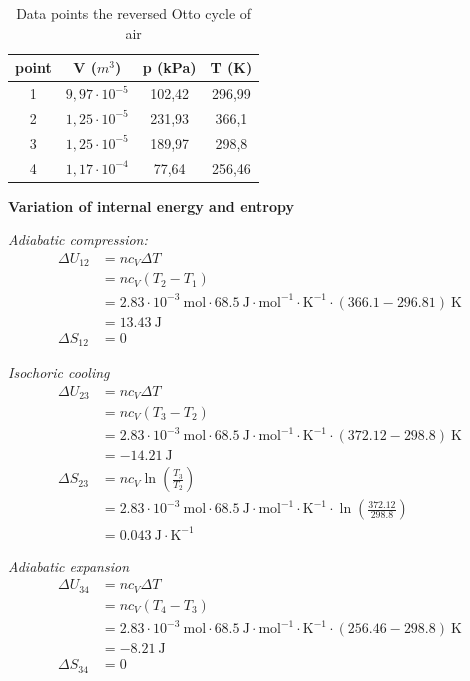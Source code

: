 \documentclass{scrartcl}
\begin{document}
\begin{table}[!ht]
    \centering
    \begin{tabular}{c|c|c|c}
        point & V ($m^3$) & p (kPa) & T (K)  \\
        \hline
        1 & $9,97 \cdot 10^{-5}$ & 102,42 & 296,99\\
        2 & $1,25 \cdot 10^{-5}$ & 231,93 & 366,1\\
        3 & $1,25 \cdot 10^{-5}$ & 189,97 & 298,8 \\
        4 & $1,17 \cdot 10^{-4}$ & 77,64 & 256,46
    \end{tabular}
    \caption{Data points the reversed Otto cycle of air}
    \label{tab:Data_airOtto}
\end{table}

\textbf{Variation of internal energy and entropy}

\textit{Adiabatic compression:}
\begin{align*}
    \Delta U_{12} &= nc_V \Delta T \\
    &= nc_V(T_2 - T_1) \\
    &= 2.83 \cdot 10^{-3} \ \text{mol} \cdot 68.5 \ \text{J} \cdot \text{mol}^{-1} \cdot \text{K}^{-1} \cdot (366.1-296.81) \ \text{K} \\
    &= 13.43 \ \text{J} \\
    \Delta S_{12} &= 0
\end{align*}

\textit{Isochoric cooling}
\begin{align*}
    \Delta U_{23} &= nc_V \Delta T \\
    &= nc_V(T_3 - T_2) \\
    &= 2.83 \cdot 10^{-3} \ \text{mol} \cdot 68.5 \ \text{J} \cdot \text{mol}^{-1} \cdot \text{K}^{-1} \cdot (372.12 - 298.8) \ \text{K} \\
    &= -14.21 \ \text{J} \\
    \Delta S_{23} &= nc_V \ln \left( \frac{T_3}{T_2} \right) \\
    &= 2.83 \cdot 10^{-3} \ \text{mol} \cdot 68.5 \ \text{J} \cdot \text{mol}^{-1} \cdot \text{K}^{-1} \cdot \ln \left( \frac{372.12}{298.8} \right) \\
    &= 0.043 \ \text{J} \cdot \text{K}^{-1}
\end{align*}

\textit{Adiabatic expansion}
\begin{align*}
    \Delta U_{34} &= nc_V \Delta T \\
    &= nc_V(T_4 - T_3) \\
    &= 2.83 \cdot 10^{-3} \ \text{mol} \cdot 68.5 \ \text{J} \cdot \text{mol}^{-1} \cdot \text{K}^{-1} \cdot (256.46-298.8) \ \text{K} \\
    &= -8.21 \ \text{J} \\
    \Delta S_{34} &= 0
\end{align*}
\end{document}
